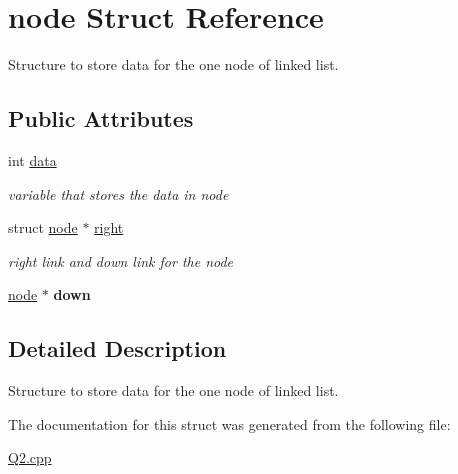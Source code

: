 \hypertarget{structnode}{}\section{node Struct Reference}
\label{structnode}


Structure to store data for the one node of linked list.  


\subsection*{Public Attributes}
\begin{DoxyCompactItemize}
\item 
\mbox{\label{structnode_a2d890bb9f6af0ffd73fe79b21124c2a2}} 
int \hyperlink{structnode_a2d890bb9f6af0ffd73fe79b21124c2a2}{data}
\begin{DoxyCompactList}\small\item\em variable that stores the data in node \end{DoxyCompactList}\item 
\mbox{\label{structnode_a875f75abfe22103500535b179828e4e3}} 
struct \hyperlink{structnode}{node} $\ast$ \hyperlink{structnode_a875f75abfe22103500535b179828e4e3}{right}
\begin{DoxyCompactList}\small\item\em right link and down link for the node \end{DoxyCompactList}\item 
\mbox{\label{structnode_aeeb779fc3a7a55de82aa7e1400bf519a}} 
\hyperlink{structnode}{node} $\ast$ {\bfseries down}
\end{DoxyCompactItemize}


\subsection{Detailed Description}
Structure to store data for the one node of linked list. 

The documentation for this struct was generated from the following file\+:\begin{DoxyCompactItemize}
\item 
\hyperlink{Q2_8cpp}{Q2.\+cpp}\end{DoxyCompactItemize}
